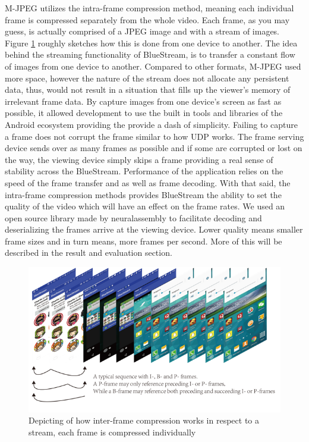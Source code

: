 \documentclass[a4paper,12pt]{article}
\begin{document}
M-JPEG utilizes the intra-frame compression method, meaning each individual frame is compressed separately from the whole video. Each frame, as you may guess, is actually comprised of a JPEG image and with a stream of images. Figure \ref{fig:MJPEG} roughly sketches how this is done from one device to another. The idea behind the streaming functionality of BlueStream, is to transfer a constant flow of images from one device to another. Compared to other formats, M-JPEG used more space, however the nature of the stream does not allocate any persistent data, thus, would not result in a situation that fills up the viewer’s memory of irrelevant frame data. By capture images from one device’s screen as fast as possible, it allowed development to use the built in tools and libraries of the Android ecosystem providing the provide a dash of simplicity. Failing to capture a frame does not corrupt the frame similar to how UDP works. The frame serving device sends over as many frames as possible and if some are corrupted or lost on the way, the viewing device simply skips a frame providing a real sense of stability across the BlueStream. Performance of the application relies on the speed of the frame transfer and as well as frame decoding. With that said, the intra-frame compression methods provides BlueStream the ability to set the quality of the video which will have an effect on the frame rates. We used an open source library made by neuralassembly \cite{SimpleMjpegView} to facilitate decoding and deserializing the frames arrive at the viewing device. Lower quality means smaller frame sizes and in turn means, more frames per second. More of this will be described in the result and evaluation section. 

\begin{figure}[h!]
\centering
\includegraphics[scale=.7]{Figures/Figure6.png}
\caption{Depicting of how inter-frame compression works in respect to a stream, each frame is compressed individually}
\label{fig:MJPEG}
\end{figure}
\end{document}
